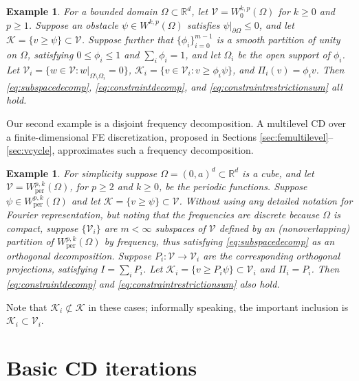 \documentclass[letterpaper,final,12pt,reqno]{amsart}
\theoremstyle{cstyle}
\theoremstyle{cstyle*}
\theoremstyle{dstyle}
\newtheorem{example}[theorem]{Example}
\numberwithin{equation}{section}
\numberwithin{figure}{section}
\numberwithin{table}{section}
\numberwithin{theorem}{section}
\newcommand{\RR}{\mathbb{R}}
\newcommand{\cK}{\mathcal{K}}
\newcommand{\cV}{\mathcal{V}}
\begin{document}
\begin{example}  \label{ex:domaindecomposition}  For a bounded domain $\Omega \subset \RR^d$, let $\cV = W_0^{k,p}(\Omega)$ for $k\ge 0$ and $p\ge 1$.  Suppose an obstacle $\psi \in W^{k,p}(\Omega)$ satisfies $\psi|_{\partial \Omega} \le 0$, and let $\cK = \{v \ge \psi\} \subset \cV$.  Suppose further that $\{\phi_i\}_{i=0}^{m-1}$ is a smooth partition of unity on $\Omega$, satisfying $0 \le \phi_i\le 1$ and $\sum_i \phi_i = 1$, and let $\Omega_i$ be the open support of $\phi_i$.  Let $\cV_i = \{w \in \cV:w|_{\Omega \setminus \Omega_i} =0 \}$, $\cK_i = \{v \in \cV_i: v \ge \phi_i \psi\}$, and $\Pi_i(v) = \phi_i v$.  Then \eqref{eq:subspacedecomp}, \eqref{eq:constraintdecomp}, and \eqref{eq:constraintrestrictionsum} all hold.
\end{example}

Our second example is a disjoint frequency decomposition.  A multilevel CD over a finite-dimensional FE discretization, proposed in Sections \ref{sec:femultilevel}--\ref{sec:vcycle}, approximates such a frequency decomposition.

\begin{example}  \label{ex:frequencydecomposition}  For simplicity suppose $\Omega = (0,a)^d \subset \RR^d$ is a cube, and let $\cV = W_{\text{per}}^{p,k}(\Omega)$, for $p\ge 2$ and $k\ge 0$, be the periodic functions.  Suppose $\psi \in W_{\text{per}}^{p,k}(\Omega)$ and let $\cK = \{v \ge \psi\} \subset \cV$.  Without using any detailed notation for Fourier representation, but noting that the frequencies are discrete because $\Omega$ is compact, suppose $\{\cV_i\}$ are $m<\infty$ subspaces of $\cV$ defined by an (nonoverlapping) partition of $W_{\text{per}}^{p,k}(\Omega)$ by frequency, thus satisfying \eqref{eq:subspacedecomp} as an orthogonal decomposition.  Suppose $P_i:\cV \to \cV_i$ are the corresponding orthogonal projections, satisfying $I = \sum_i P_i$.  Let $\cK_i = \{v \ge P_i \psi\} \subset \cV_i$ and $\Pi_i = P_i$.  Then \eqref{eq:constraintdecomp} and \eqref{eq:constraintrestrictionsum} also hold.
\end{example}

Note that $\cK_i \not\subset \cK$ in these cases; informally speaking, the important inclusion is $\cK_i \subset \cV_i$.


\section{Basic CD iterations} \label{sec:cditers}
\end{document}
